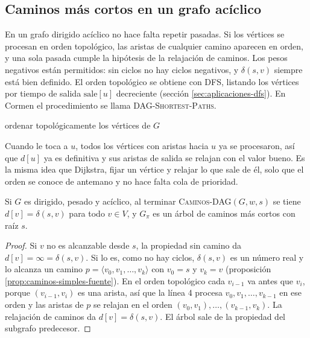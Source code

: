 \documentclass[11pt,letterpaper]{article}
\begin{document}

\subsection*{Caminos más cortos en un grafo acíclico}

En un grafo dirigido acíclico no hace falta repetir pasadas. Si los
vértices se procesan en orden topológico, las aristas de cualquier
camino aparecen en orden, y una sola pasada cumple la hipótesis de la
relajación de caminos. Los pesos negativos están permitidos: sin
ciclos no hay ciclos negativos, y $\delta(s, v)$ siempre está bien
definido. El orden topológico se obtiene con DFS, listando los
vértices por tiempo de salida $\text{sale}[u]$ decreciente (sección
\ref{sec:aplicaciones-dfs}). En Cormen el procedimiento se llama
\textsc{DAG-Shortest-Paths}.

\begin{algorithm}[H]
\caption{\textsc{Caminos-DAG}$(G, w, s)$}
\label{alg:caminos-dag}
\begin{algorithmic}[1]
  \State ordenar topológicamente los vértices de $G$
  \State {}
      \State {}
    \EndFor
  \EndFor
\EndProcedure
\end{algorithmic}
\end{algorithm}

Cuando le toca a $u$, todos los vértices con aristas hacia $u$ ya se
procesaron, así que $d[u]$ ya es definitiva y sus aristas de salida se
relajan con el valor bueno. Es la misma idea que Dijkstra, fijar un
vértice y relajar lo que sale de él, solo que el orden se conoce de
antemano y no hace falta cola de prioridad.

\begin{teorema}\label{teo:caminos-dag-correccion}
  Si $G$ es dirigido, pesado y acíclico, al terminar
  \textsc{Caminos-DAG}$(G, w, s)$ se tiene $d[v] = \delta(s, v)$ para
  todo $v \in V$, y $G_\pi$ es un árbol de caminos más cortos con raíz
  $s$.
\end{teorema}

\begin{proof}
  Si $v$ no es alcanzable desde $s$, la propiedad sin camino da
  $d[v] = \infty = \delta(s, v)$. Si lo es, como no hay ciclos,
  $\delta(s, v)$ es un número real y lo alcanza un camino
  $p = \langle v_0, v_1, \dots, v_k\rangle$ con $v_0 = s$ y $v_k = v$
  (proposición \ref{prop:caminos-simples-fuente}). En el orden
  topológico cada $v_{i-1}$ va antes que $v_i$, porque
  $(v_{i-1}, v_i)$ es una arista, así que la línea 4 procesa
  $v_0, v_1, \dots, v_{k-1}$ en ese orden y las aristas de $p$ se
  relajan en el orden $(v_0, v_1), \dots, (v_{k-1}, v_k)$. La
  relajación de caminos da $d[v] = \delta(s, v)$. El árbol sale de la
  propiedad del subgrafo predecesor.
\end{proof}
\end{document}
